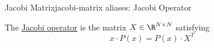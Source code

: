 \begin{definition}{Jacobi Matrix}{jacobi-matrix}
  aliases: Jacobi Operator

  The \href{https://en.wikipedia.org/wiki/Jacobi_operator}{Jacobi
    operator} is the matrix \(X \in \R^{N \times N}\) satisfying
  $$x \cdot P(x) = P(x) \cdot X^T$$
\end{definition}
